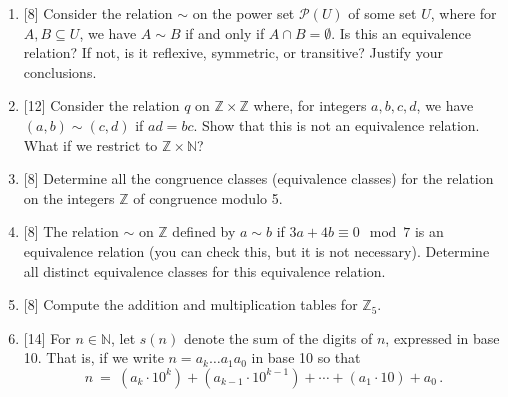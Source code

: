 \documentclass[12pt]{article}
\newcommand{\NN}{{\mathbb N}}
\newcommand{\ZZ}{{\mathbb Z}}
\begin{document}
\begin{enumerate}
  \item{[8]}  Consider the relation $\sim$ on the power set $\mathcal{P}(U)$ of some set $U$, where
    for $A,B\subseteq U$, we have $A\sim B$ if and only if  $A\cap B=\emptyset$.
    Is this an equivalence relation?
    If not, is it reflexive, symmetric, or transitive?
    Justify your conclusions.


  \item{[12]}  Consider the relation $q$ on $\ZZ\times \ZZ$ where, for integers $a,b,c,d$, we have
    $(a,b)\sim (c,d)$ if $ad=bc$.
    Show that this is not an equivalence relation.
    What if we restrict to $\ZZ\times\NN$?

  \item{[8]}  Determine all the congruence classes (equivalence classes) for the relation on the integers $\ZZ$ of congruence modulo 5.

  \item{[8]}  The relation $\sim$ on $\ZZ$ defined by $a\sim b$ if $3a+4b\equiv 0 \mod 7$ is an equivalence relation (you can check this, but
    it is not necessary).
    Determine all distinct equivalence classes for this equivalence relation.

\item{[8]} Compute the addition and multiplication tables for $\ZZ_5$.



\item{[14]} For $n\in \NN$, let $s(n)$ denote the sum of the digits of $n$, expressed in base 10.
  That is, if we write $n=a_k\dotsc a_1 a_0$ in base 10 so that
  \[
     n\ =\ \left(a_k\cdot 10^k\right) +   \left(a_{k-1}\cdot 10^{k-1}\right) +\dotsb + 
     \left(a_1\cdot 10\right) + a_0\,.
     \]


\end{enumerate}
\end{document}
